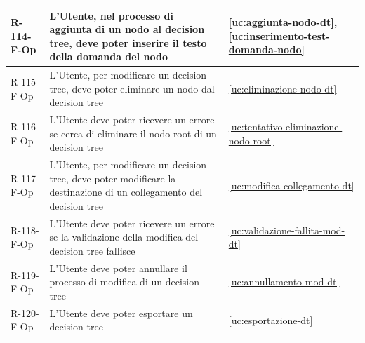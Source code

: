 ﻿\documentclass[a4paper,12pt]{article}
\begin{document}
{{\begin{longtable}{|l|p{}|p{}|}
            R-114-F-Op       & L'Utente, nel processo di aggiunta di un nodo al decision tree, deve poter inserire il testo della domanda del nodo                                                                         & \ref{uc:aggiunta-nodo-dt}, \ref{uc:inserimento-test-domanda-nodo}                 \\ \hline
            R-115-F-Op       & L'Utente, per modificare un decision tree, deve poter eliminare un nodo dal decision tree                                                                                                   & \ref{uc:eliminazione-nodo-dt}                                               \\ \hline
            R-116-F-Op      & L'Utente deve poter ricevere un errore se cerca di eliminare il nodo root di un decision tree                                                                                               & \ref{uc:tentativo-eliminazione-nodo-root}                                               \\ \hline
            R-117-F-Op      & L'Utente, per modificare un decision tree, deve poter modificare la destinazione di un collegamento del decision tree                                                                       & \ref{uc:modifica-collegamento-dt}                                               \\ \hline
            R-118-F-Op      & L'Utente deve poter ricevere un errore se la validazione della modifica del decision tree fallisce                                                                                          & \ref{uc:validazione-fallita-mod-dt}                                               \\ \hline
            R-119-F-Op      & L'Utente deve poter annullare il processo di modifica di un decision tree                                                                                                                   & \ref{uc:annullamento-mod-dt}                                               \\ \hline
            R-120-F-Op      & L'Utente deve poter esportare un decision tree                                                                                                                                              & \ref{uc:esportazione-dt}                                               \\ \hline
        \end{longtable}
    }

    \newpage

}
\end{document}
